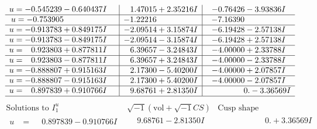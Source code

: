 \documentclass[1p]{elsarticle_modified}
\theoremstyle{definition}
\newcommand{\I}{\sqrt{-1}}
\begin{document}
$$\begin{array}{c|c|c}
\begin{aligned}
u &= -0.545239 - 0.640437 I\end{aligned}
 & \phantom{-}1.47015 + 2.35216 I & -0.76426 - 3.93836 I \\ \hline\begin{aligned}
u &= -0.753905\phantom{ +0.000000I}\end{aligned}
 & -1.22216\phantom{ +0.000000I} & -7.16390\phantom{ +0.000000I} \\ \hline\begin{aligned}
u &= -0.913783 + 0.849175 I\end{aligned}
 & -2.09514 + 3.15874 I & -6.19428 - 2.57138 I \\ \hline\begin{aligned}
u &= -0.913783 - 0.849175 I\end{aligned}
 & -2.09514 - 3.15874 I & -6.19428 + 2.57138 I \\ \hline\begin{aligned}
u &= \phantom{-}0.923803 + 0.877811 I\end{aligned}
 & \phantom{-}6.39657 - 3.24843 I & -4.00000 + 2.33788 I \\ \hline\begin{aligned}
u &= \phantom{-}0.923803 - 0.877811 I\end{aligned}
 & \phantom{-}6.39657 + 3.24843 I & -4.00000 - 2.33788 I \\ \hline\begin{aligned}
u &= -0.888807 + 0.915163 I\end{aligned}
 & \phantom{-}2.17300 - 5.40200 I & -4.00000 + 2.07857 I \\ \hline\begin{aligned}
u &= -0.888807 - 0.915163 I\end{aligned}
 & \phantom{-}2.17300 + 5.40200 I & -4.00000 - 2.07857 I \\ \hline\begin{aligned}
u &= \phantom{-}0.897839 + 0.910766 I\end{aligned}
 & \phantom{-}9.68761 + 2.81350 I & \phantom{-0.000000 } 0. - 3.36569 I\\
 \hline 
 \end{array}$$\newpage$$\begin{array}{c|c|c}  
\text{Solutions to }I^u_{1}& \I (\text{vol} + \sqrt{-1}CS) & \text{Cusp shape}\\
 \hline 
\begin{aligned}
u &= \phantom{-}0.897839 - 0.910766 I\end{aligned}
 & \phantom{-}9.68761 - 2.81350 I & \phantom{-0.000000 -}0. + 3.36569 I \\ \hline\begin{aligned}

\end{aligned}
\end{array}$$
\end{document}
